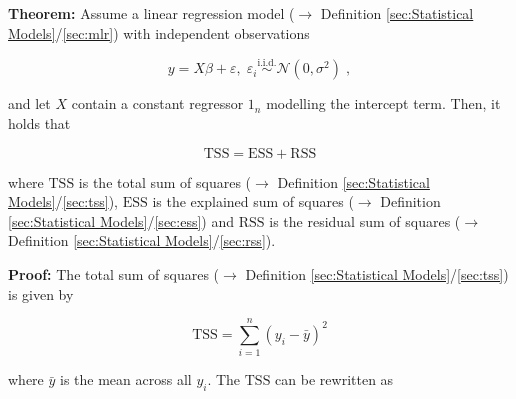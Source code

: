 \documentclass[a4paper,12pt,twoside]{book}
\begin{document}
\textbf{Theorem:} Assume a linear regression model ($\rightarrow$ Definition \ref{sec:Statistical Models}/\ref{sec:mlr}) with independent observations

\begin{equation} \label{eq:mlr-pss-mlr}
y = X\beta + \varepsilon, \; \varepsilon_i \overset{\mathrm{i.i.d.}}{\sim} \mathcal{N}(0, \sigma^2) \; ,
\end{equation}

and let $X$ contain a constant regressor $1_n$ modelling the intercept term. Then, it holds that

\begin{equation} \label{eq:mlr-pss-pss}
\mathrm{TSS} = \mathrm{ESS} + \mathrm{RSS}
\end{equation}

where $\mathrm{TSS}$ is the total sum of squares ($\rightarrow$ Definition \ref{sec:Statistical Models}/\ref{sec:tss}), $\mathrm{ESS}$ is the explained sum of squares ($\rightarrow$ Definition \ref{sec:Statistical Models}/\ref{sec:ess}) and $\mathrm{RSS}$ is the residual sum of squares ($\rightarrow$ Definition \ref{sec:Statistical Models}/\ref{sec:rss}).


\vspace{1em}
\textbf{Proof:} The total sum of squares ($\rightarrow$ Definition \ref{sec:Statistical Models}/\ref{sec:tss}) is given by

\begin{equation} \label{eq:mlr-pss-TSS}
\mathrm{TSS} = \sum_{i=1}^{n} (y_i - \bar{y})^2
\end{equation}

where $\bar{y}$ is the mean across all $y_i$. The $\mathrm{TSS}$ can be rewritten as
\end{document}

